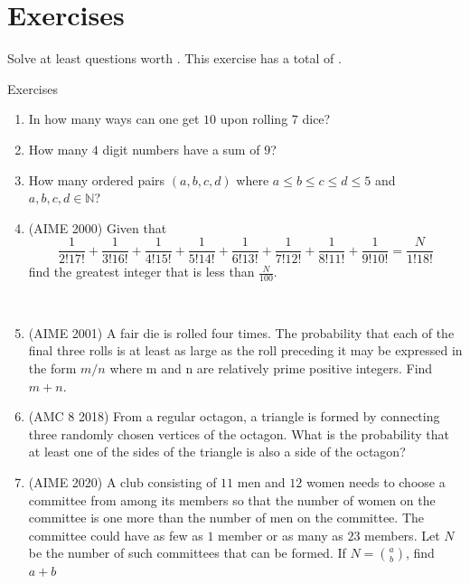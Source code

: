 \section{Exercises}
Solve at least questions worth . This exercise has a total of .
\begin{xcb}{Exercises}
\begin{enumerate}
\item {} In how many ways can one get $10$ upon rolling $7$ dice?
\item {} How many $4$ digit numbers have a sum of $9$?
\item {} How many ordered pairs $(a,b,c,d)$ where $a \le b \le c \le d \le 5$ and $a,b,c,d \in \mathbb{N}$?
\begin{hint}
\end{hint}
\item (AIME 2000)  Given that\\
\[\frac 1{2!17!}+\frac 1{3!16!}+\frac 1{4!15!}+\frac 1{5!14!}+\frac 1{6!13!}+\frac 1{7!12!}+\frac 1{8!11!}+\frac 1{9!10!}=\frac N{1!18!}\]
find the greatest integer that is less than $\frac N{100}$.
\begin{hint}
    \\
\end{hint}
\item(AIME 2001)  A fair die is rolled four times. The probability that each of the final three rolls is at least as large as the roll preceding it may be expressed in the form $m/n$ where m and n are relatively prime positive integers. Find $m + n$.
\item (AMC 8 2018)  From a regular octagon, a triangle is formed by connecting three randomly chosen vertices of the octagon. What is the probability that at least one of the sides of the triangle is also a side of the octagon?
\begin{hint}
\end{hint}
\item(AIME 2020)  A club consisting of $11$ men and $12$ women needs to choose a committee from among its members so that the number of women on the committee is one more than the number of men on the committee. The committee could have as few as $1$ member or as many as $23$ members. Let $N$ be the number of such committees that can be formed. If $N=\binom{a}{b}$, find $a + b$

\end{enumerate}
\end{xcb}
